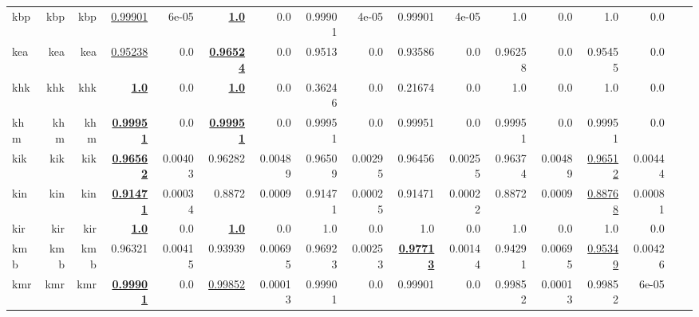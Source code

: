 \documentclass[11pt]{article}
\begin{document}
\begin{table*}[h]
{\begin{tabular}{lrrrrrrrrrrrrrrrr}
kbp         & kbp         & kbp         & \underline{0.99901}         & 6e-05         & \textbf{\underline{1.0}}         & 0.0         & 0.99901         & 4e-05         & 0.99901         & 4e-05         & 1.0         & 0.0         & 1.0         & 0.0         \\
kea         & kea         & kea         & \underline{0.95238}         & 0.0         & \textbf{\underline{0.96524}}         & 0.0         & 0.9513         & 0.0         & 0.93586         & 0.0         & 0.96258         & 0.0         & 0.95455         & 0.0         \\
khk         & khk         & khk         & \textbf{\underline{1.0}}         & 0.0         & \textbf{\underline{1.0}}         & 0.0         & 0.36246         & 0.0         & 0.21674         & 0.0         & 1.0         & 0.0         & 1.0         & 0.0         \\
khm         & khm         & khm         & \textbf{\underline{0.99951}}         & 0.0         & \textbf{\underline{0.99951}}         & 0.0         & 0.99951         & 0.0         & 0.99951         & 0.0         & 0.99951         & 0.0         & 0.99951         & 0.0         \\
kik         & kik         & kik         & \textbf{\underline{0.96562}}         & 0.00403         & 0.96282         & 0.00489         & 0.96509         & 0.00295         & 0.96456         & 0.00255         & 0.96374         & 0.00489         & \underline{0.96512}         & 0.00444         \\
kin         & kin         & kin         & \textbf{\underline{0.91471}}         & 0.00034         & 0.8872         & 0.0009         & 0.91471         & 0.00025         & 0.91471         & 0.00022         & 0.8872         & 0.0009         & \underline{0.88768}         & 0.00081         \\
kir         & kir         & kir         & \textbf{\underline{1.0}}         & 0.0         & \textbf{\underline{1.0}}         & 0.0         & 1.0         & 0.0         & 1.0         & 0.0         & 1.0         & 0.0         & 1.0         & 0.0         \\
kmb         & kmb         & kmb         & 0.96321         & 0.00415         & 0.93939         & 0.00695         & 0.96923         & 0.00253         & \textbf{\underline{0.97713}}         & 0.00144         & 0.94291         & 0.00695         & \underline{0.95349}         & 0.00426         \\
kmr         & kmr         & kmr         & \textbf{\underline{0.99901}}         & 0.0         & \underline{0.99852}         & 0.00013         & 0.99901         & 0.0         & 0.99901         & 0.0         & 0.99852         & 0.00013         & 0.99852         & 6e-05         \\

\end{tabular}}
\end{table*}
\end{document}
